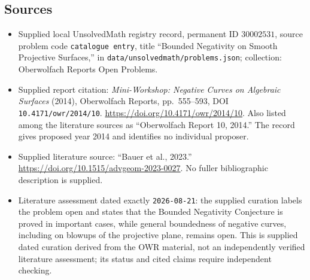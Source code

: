 \documentclass[11pt]{article}
\begin{document}
\subsection{Sources}
\begin{itemize}
\item Supplied local UnsolvedMath registry record, permanent ID \(30002531\), source problem code \texttt{catalogue entry}, title ``Bounded Negativity on Smooth Projective Surfaces,'' in \texttt{data/unsolvedmath/problems.json}; collection: Oberwolfach Reports Open Problems.
\item Supplied report citation: \emph{Mini-Workshop: Negative Curves on Algebraic Surfaces} (2014), Oberwolfach Reports, pp.\ 555--593, DOI \texttt{10.4171/owr/2014/10}. \url{https://doi.org/10.4171/owr/2014/10}. Also listed among the literature sources as ``Oberwolfach Report 10, 2014.'' The record gives proposed year 2014 and identifies no individual proposer.
\item Supplied literature source: ``Bauer et al., 2023.'' \url{https://doi.org/10.1515/advgeom-2023-0027}. No fuller bibliographic description is supplied.
\item Literature assessment dated exactly \texttt{2026-08-21}: the supplied curation labels the problem open and states that the Bounded Negativity Conjecture is proved in important cases, while general boundedness of negative curves, including on blowups of the projective plane, remains open. This is supplied dated curation derived from the OWR material, not an independently verified literature assessment; its status and cited claims require independent checking.
\end{itemize}
\end{document}
